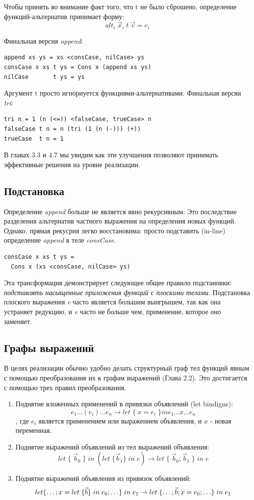 \documentclass[flenqn, 14pt]{extarticle}
\begin{document}
Чтобы принять во внимание факт того, что t не было сброшено, определение функций-альтернатив принимает форму:
$$
alt_i \; \vec{x}_i \; t \; \vec{v} = e_i
$$

Финальная версия \textit{append}:
\begin{verbatim}
append xs ys = xs <consCase, nilCase> ys
consCase x xs t ys = Cons x (append xs ys)
nilCase       t ys = ys
\end{verbatim}

Аргумент t просто игнориуется функциями-альтернативами. Финальная версяи \textit{tri}:
\begin{verbatim}
tri n = 1 (n (<=)) <falseCase, trueCase> n
falseCase t n = n (tri (1 (n (-))) (+))
trueCase  t n = 1
\end{verbatim}

В главах 3.3 и 4.7 мы увидим как эти улучшения позволяют принимать эффективные решения на уровне реализации.

\subsection{Подстановка}
Определение \textit{append} больше не является явно рекурсивным. Это последствие разделения альтернатив частного выражения на определения новых функций. Однако, прямая рекусрия легко восстановима: просто подставить (in-line) определение \textit{append} в теле \textit{consCase}.
\begin{verbatim}
consCase x xs t ys =
  Cons x (xs <consCase, nilCase> ys)
\end{verbatim}

Эта трансформация демонстрирует следующее общее правило подстановки: \textit{подставлять насыщенные приложения функций с плоскими телами}. Подстановка плоского выражения \textit{e} часто является большим выигрышем, так как она устраняет редукцию, и \textit{e} часто не больше чем, применение, которое оно заменяет.

\subsection{Графы выражений}
В целях реализации обычно удобно делать структурный граф тел функций явным с помощью преобразования их к графам выражений (Глава 2.2). Это достигается с помощью трех правил преобразования.
\begin{enumerate}
\item Поднятие вложенных применений в привязки объявлений (let bindigns):
$$
e_1 \ldots (e_i) \ldots e_n \rightarrow let \; \{ \; x = e_i \; \} in e_1 \ldots x \ldots e_n
$$
, где $e_i$ является применением или выражением объявления, и $x$ - новая переменная.
\item Поднятие выражений объявлений из тел выражений объявления:
$$
let \; \{ \; \vec{b}_0 \; \} \; in \; (let \; \{ \vec{b}_1 \} \; in \; e) \rightarrow let \; \{ \; \vec{b}_0 ; \vec{b}_1 \; \} \; in \; e
$$
\item Поднятие выражений объявления из привязок объявлений:
$$
let \{ \ldots ; x = let \; \{ \vec{b} \} \; in \; e_0 ; \ldots \} \; in \; e_1 \rightarrow \\
	let \; \{ \ldots; \vec{b} ; x = e_0 ; \ldots \} \; in \; e_1
$$
\end{enumerate}
\end{document}
